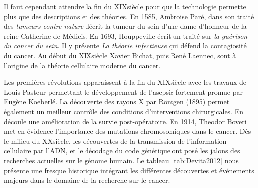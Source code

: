 			Il faut cependant attendre la fin du XIX\eme siècle pour que la technologie permette plus que des descriptions et des théories.
			En 1585, Ambroise Paré, dans son traité des \emph{tumeurs contre nature} décrit la tumeur du sein d'une dame d'honneur de la reine Catherine de Médicis.
			En 1693, Houppeville écrit un traité sur \emph{la guérison du cancer du sein}.
			Il y présente \emph{La théorie infectieuse} qui défend la contagiosité du cancer.
			Au début du XIX\eme siècle Xavier Bichat, puis René Laennec, sont à l'origine de la théorie cellulaire moderne du cancer.

			Les premières révolutions apparaissent à la fin du XIX\eme siècle avec les travaux de Louis Pasteur permettant le développement de l'asepsie fortement promue par Eugène Koeberlé.
			La découverte des rayons X par Röntgen (1895) permet également un meilleur contrôle des conditions d'interventions chirurgicales.
			En découle une amélioration de la survie post-opératoire.
			En 1914, Theodor Boveri met en évidence l'importance des mutations chromosomiques dans le cancer.
			Dès le milieu du XX\eme siècle, les découvertes de la transmission de l'information cellulaire par l'\acs{ADN}, et le décodage du code génétique ont posé les jalons des recherches actuelles sur le génome humain.
			Le tableau~\ref{tab:Devita2012} nous présente une fresque historique intégrant les différentes découvertes et événements majeurs dans le domaine de la recherche sur le cancer.

